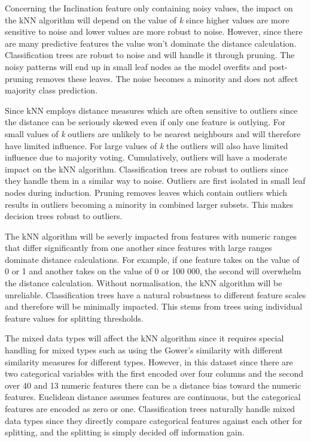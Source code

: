 \documentclass[conference]{IEEEtran}
\begin{document}
Concerning the Inclination feature only containing noisy values, the impact on the kNN algorithm will depend on the value of \textit{k} since higher values are more sensitive to noise and lower values are more robust to noise. However, since there are many predictive features the value won't dominate the distance calculation. Classification trees are robust to noise and will handle it through pruning. The noisy patterns will end up in small leaf nodes as the model overfits and post-pruning removes these leaves. The noise becomes a minority and does not affect majority class prediction.

Since kNN employs distance measures which are often sensitive to outliers since the distance can be seriously skewed even if only one feature is outlying. For small values of \textit{k} outliers are unlikely to be nearest neighbours and will therefore have limited influence. For large values of \textit{k} the outliers will also have limited influence due to majority voting. Cumulatively, outliers will have a moderate impact on the kNN algorithm. Classification trees are robust to outliers since they handle them in a similar way to noise. Outliers are first isolated in small leaf nodes during induction. Pruning removes leaves which contain outliers which results in outliers becoming a minority in combined larger subsets. This makes decision trees robust to outliers.

The kNN algorithm will be severly impacted from features with numeric ranges that differ significantly from one another since features with large ranges dominate distance calculations. For example, if one feature takes on the value of 0 or 1 and another takes on the value of 0 or 100 000, the second will overwhelm the distance calculation. Without normalisation, the kNN algorithm will be unreliable. Classification trees have a natural robustness to different feature scales and therefore will be minimally impacted. This stems from trees using individual feature values for splitting thresholds.

The mixed data types will affect the kNN algorithm since it requires special handling for mixed types such as using the Gower's similarity with different similarity measures for different types. However, in this dataset since there are two categorical variables with the first encoded over four columns and the second over 40 and 13 numeric features there can be a distance bias toward the numeric features. Euclidean distance assumes features are continuous, but the categorical features are encoded as zero or one. Classification trees naturally handle mixed data types since they directly compare categorical features against each other for splitting, and the splitting is simply decided off information gain.
\end{document}
